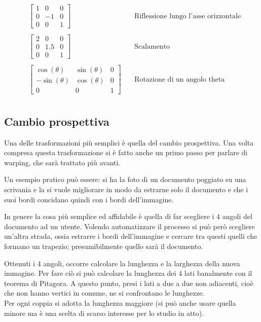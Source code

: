 \begin{align*}
&\begin{bmatrix}
1&0&0\\
0&-1&0\\
0&0&1
\end{bmatrix}&~&
\text{Riflessione lungo l'asse orizzontale}\\
\\
&\begin{bmatrix}
2&0&0\\
0&1.5&0\\
0&0&1
\end{bmatrix}&~&
\text{Scalamento}\\
\\
&\begin{bmatrix}
\cos(\theta )&\sin(\theta )&0\\
-\sin(\theta )&\cos(\theta )&0\\
0&0&1
\end{bmatrix}&~&
\text{Rotazione di un angolo theta}\\
\end{align*}



\subsection{Cambio prospettiva}
Una delle trasformazioni più semplici è quella del cambio prospettiva. Una volta compresa questa trasformazione si è fatto anche un primo passo per parlare di warping, che sarà trattato più avanti.

\vspace{1em} \noindent
Un esempio pratico può essere: si ha la foto di un documento poggiato su una scrivania e la si vuole migliorare in modo da estrarne solo il documento e che i suoi bordi concidano quindi con i bordi dell'immagine.

\vspace{1em} \noindent
In genere la cosa più semplice ed affidabile è quella di far scegliere i 4 angoli del documento ad un utente. Volendo automatizzare il processo si può però scegliere un'altra strada, ossia estrarre i bordi dell'immagine e cercare tra questi quelli che formano un trapezio; presumibilmente quello sarà il documento.

\vspace{1em} \noindent
Ottenuti i 4 angoli, occorre calcolare la lunghezza e la larghezza della nuova immagine. Per fare ciò si può calcolare la lunghezza dei 4 lati banalmente con il teorema di Pitagora. A questo punto, presi i lati a due a due non adiacenti, cioè che non hanno vertici in comune, ne si confrontano le lunghezze.\\
Per ogni coppia si adotta la lunghezza maggiore (si può anche usare quella minore ma è una scelta di scarso interesse per lo studio in atto).

